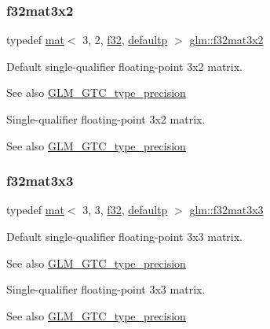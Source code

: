 \subsubsection{\texorpdfstring{f32mat3x2}{f32mat3x2}}
{\footnotesize\ttfamily typedef \mbox{\hyperlink{structglm_1_1mat}{mat}}$<$ 3, 2, \mbox{\hyperlink{group__gtc__type__precision_ga0ec999b57f5330d9021256e96038df04}{f32}}, \mbox{\hyperlink{namespaceglm_a36ed105b07c7746804d7fdc7cc90ff25a9d21ccd8b5a009ec7eb7677befc3bf51}{defaultp}} $>$ \mbox{\hyperlink{group__gtc__type__precision_ga924b933089d954df062aa8d0735fc005}{glm\+::f32mat3x2}}}

Default single-\/qualifier floating-\/point 3x2 matrix. \begin{DoxySeeAlso}{See also}
\mbox{\hyperlink{group__gtc__type__precision}{G\+L\+M\+\_\+\+G\+T\+C\+\_\+type\+\_\+precision}}
\end{DoxySeeAlso}
Single-\/qualifier floating-\/point 3x2 matrix. \begin{DoxySeeAlso}{See also}
\mbox{\hyperlink{group__gtc__type__precision}{G\+L\+M\+\_\+\+G\+T\+C\+\_\+type\+\_\+precision}} 
\end{DoxySeeAlso}
\mbox{\label{group__gtc__type__precision_ga177c076d6d9aea27a5ae87b52607e57a}} 
\subsubsection{\texorpdfstring{f32mat3x3}{f32mat3x3}}
{\footnotesize\ttfamily typedef \mbox{\hyperlink{structglm_1_1mat}{mat}}$<$ 3, 3, \mbox{\hyperlink{group__gtc__type__precision_ga0ec999b57f5330d9021256e96038df04}{f32}}, \mbox{\hyperlink{namespaceglm_a36ed105b07c7746804d7fdc7cc90ff25a9d21ccd8b5a009ec7eb7677befc3bf51}{defaultp}} $>$ \mbox{\hyperlink{group__gtc__type__precision_ga177c076d6d9aea27a5ae87b52607e57a}{glm\+::f32mat3x3}}}

Default single-\/qualifier floating-\/point 3x3 matrix. \begin{DoxySeeAlso}{See also}
\mbox{\hyperlink{group__gtc__type__precision}{G\+L\+M\+\_\+\+G\+T\+C\+\_\+type\+\_\+precision}}
\end{DoxySeeAlso}
Single-\/qualifier floating-\/point 3x3 matrix. \begin{DoxySeeAlso}{See also}
\mbox{\hyperlink{group__gtc__type__precision}{G\+L\+M\+\_\+\+G\+T\+C\+\_\+type\+\_\+precision}} 
\end{DoxySeeAlso}
\mbox{\label{group__gtc__type__precision_ga8459d79e94eb107e31f0ee600e9bae3f}} 
